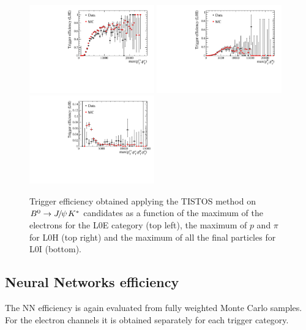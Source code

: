 \begin{figure}[h!]
\centering
\includegraphics[width=0.48\textwidth]{RKst/figs/TisTos_vs_maxPTLL_L0E.pdf}
\includegraphics[width=0.48\textwidth]{RKst/figs/TisTos_vs_maxPTHH_L0H.pdf}
\includegraphics[width=0.48\textwidth]{RKst/figs/TisTos_vs_maxPT_L0I.pdf}
\caption{Trigger efficiency obtained applying the TISTOS method on $\Bz\to\jpsi\Kstar$ candidates
as a function of the maximum \pt of the electrons for the L0E category (top left), the maximum \pt
of $p$ and $\pi$ for L0H (top right) and the maximum \pt of all the final particles for L0I (bottom).}
\label{fig:tistos_vs_pt}
\end{figure}


\subsection{Neural Networks efficiency}
\label{sec:Rkst_mva_eff}

The NN efficiency is again evaluated from fully weighted Monte Carlo samples. 
For the electron channels it is obtained separately for each trigger category.

